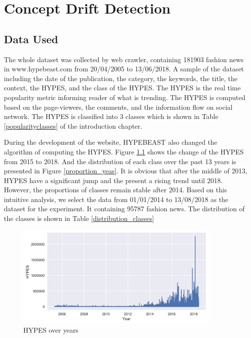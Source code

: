 \chapter{Concept Drift Detection}
\label{exp1}
\section{Data Used}

The whole dataset was collected by web crawler, containing 181903 fashion news in www.hypebeast.com from 20/04/2005 to 13/06/2018. A sample of the dataset including the date of the publication, the category, the keywords, the title, the context, the HYPES, and the class of the HYPES. The HYPES is the real time popularity metric informing reader of what is trending. The HYPES is computed based on the page-viewers, the comments, and the information flow on social network. The HYPES is classified into 3 classes which is shown in Table \ref{popularityclasses} of the introduction chapter. 

During the development of the website, HYPEBEAST also changed the algorithm of computing the HYPES. Figure \ref{hypes_yeas} shows the change of the HYPES from 2015 to 2018. And the distribution of each class over the past 13 years is presented in Figure \ref{proportion_yeas}. It is obvious that after the middle of 2013, HYPES have a significant jump and the present a rising trend until 2018. However, the proportions of classes remain stable after 2014. Based on this intuitive analysis, we select the data from 01/01/2014 to 13/08/2018 as the dataset for the experiment. It containing 95787 fashion news. The distribution of the classes is shown in Table \ref{distribution_classes}

\begin{figure}
\centering
\includegraphics[width=0.9\textwidth]{hypes_year.png}
\caption{HYPES over years}
\label{hypes_yeas}

\end{figure}

